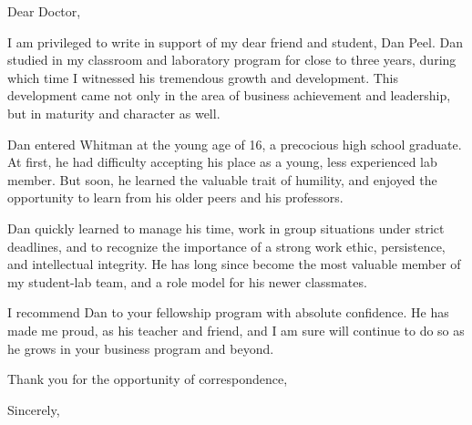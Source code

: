 \documentclass[a4paper,11pt]{article}
\begin{document}
Dear Doctor, 

I am privileged to write in support of my dear friend and student, Dan Peel. Dan studied in my classroom and
laboratory program for close to three years, during which time I witnessed his tremendous growth and development. This
development came not only in the area of business achievement and leadership, but in maturity and character as well.

Dan entered Whitman at the young age of 16, a precocious high school graduate. At first, he had difficulty accepting his
place as a young, less experienced lab member. But soon, he learned the valuable trait of humility, and enjoyed the
opportunity to learn from his older peers and his professors.

Dan quickly learned to manage his time, work in group situations under strict deadlines, and to recognize the importance
of a strong work ethic, persistence, and intellectual integrity. He has long since become the most valuable member of
my student-lab team, and a role model for his newer classmates.

I recommend Dan to your fellowship program with absolute confidence. He has made me proud, as his teacher and friend,
and I am sure will continue to do so as he grows in your business program and beyond.

Thank you for the opportunity of correspondence,

Sincerely,
\end{document}
